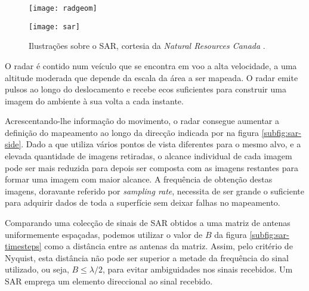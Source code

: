 \documentclass[purist,portuguese]{ist-report}
\begin{document}
\begin{figure}[ht]
	\centering
	\hspace*{\fill}
	\begin{minipage}[t]{0.43\textwidth}
		\centering
		\texttt{[image: radgeom]}
		\label{subfig:sar-side}
	\end{minipage}
	\hfill
	\begin{minipage}[t]{0.43\textwidth}
		\centering
		\texttt{[image: sar]}
		\label{subfig:sar-timesteps}
	\end{minipage}
	\hspace*{\fill}
	\caption{Ilustrações sobre o SAR, cortesia da \textit{Natural Resources Canada} \cite{nrcan}.}
	\label{fig:nrcan}
\end{figure}

O radar é contido num veículo que se encontra em voo a alta velocidade, a uma altitude moderada que depende da escala da área a ser mapeada. O radar emite pulsos ao longo do deslocamento e recebe ecos suficientes para construir uma imagem do ambiente à sua volta a cada instante.

Acrescentando-lhe informação do movimento, o radar consegue aumentar a definição do mapeamento ao longo da direcção indicada por  na figura \ref{subfig:sar-side}. Dado a que utiliza vários pontos de vista diferentes para o mesmo alvo, e a elevada quantidade de imagens retiradas, o alcance individual de cada imagem pode ser mais reduzida para depois ser composta com as imagens restantes para formar uma imagem com maior alcance. A frequência de obtenção destas imagens, doravante referido por \textit{sampling rate}, necessita de ser grande o suficiente para adquirir dados de toda a superfície sem deixar falhas no mapeamento.

Comparando uma colecção de sinais de SAR obtidos a uma matriz de antenas uniformemente espaçadas, podemos utilizar o valor de $B$ da figura \ref{subfig:sar-timesteps} como a distância entre as antenas da matriz. Assim, pelo critério de Nyquist, esta distância não pode ser superior a metade da frequência do sinal utilizado, ou seja, $B \leq \lambda/2$, para evitar ambiguidades nos sinais recebidos. Um SAR emprega um elemento direccional ao sinal recebido. 

\printbibliography
\listoftodos
\end{document}
